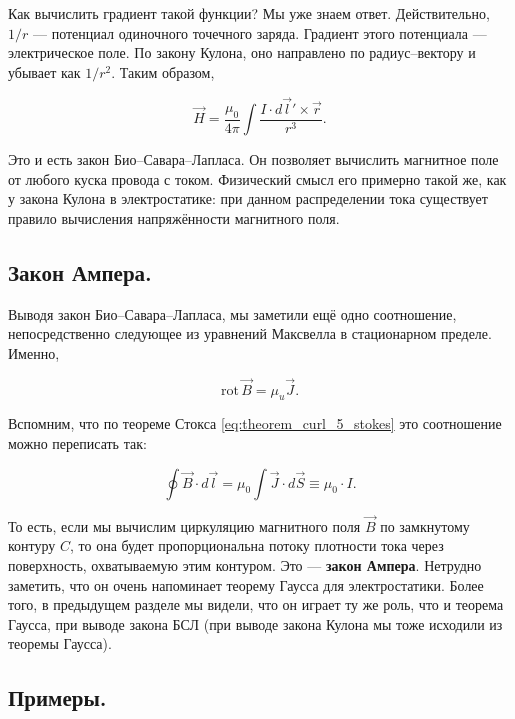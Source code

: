 \documentclass[12pt,a4paper]{article}
\numberwithin{equation}{section}
\numberwithin{equation}{section}
\newcommand{\rot}{\mathrm{rot}\,}
\begin{document}
Как вычислить градиент такой функции? Мы уже знаем
ответ. Действительно, $1/r$ --- потенциал одиночного точечного
заряда. Градиент этого потенциала --- электрическое поле. По закону
Кулона, оно направлено по радиус--вектору и убывает как $1/r^2$. Таким
образом, 

\begin{equation}
  \label{eq:der_bio-savart-laplace_3}
  \vec{H} = \frac{\mu_0}{4\pi} \int \frac{I \cdot d\vec{l}' \times \vec{r}}{r^3}.
\end{equation}

Это и есть закон Био--Савара--Лапласа. Он позволяет вычислить
магнитное поле от любого куска провода с током. Физический смысл его
примерно такой же, как у закона Кулона в электростатике: при данном
распределении тока существует правило вычисления напряжённости
магнитного поля. 

\subsection{Закон Ампера.}
\label{sec:amperes_law}

Выводя закон Био--Савара--Лапласа, мы заметили ещё одно соотношение,
непосредственно следующее из уравнений Максвелла в стационарном
пределе. Именно, 

\begin{equation}
  \label{eq:der_amperes_law}
  \rot \vec{B} = \mu_u \vec{J}.
\end{equation}

Вспомним, что по теореме Стокса \eqref{eq:theorem_curl_5_stokes} это
соотношение можно переписать так: 

\begin{equation}
  \label{eq:amperes_law}
  \oint \vec{B} \cdot d \vec{l} = \mu_0 \int \vec{J} \cdot d\vec{S} \equiv
  \mu_0 \cdot I.
\end{equation}

То есть, если мы вычислим циркуляцию магнитного поля $\vec{B}$ по
замкнутому контуру $C$, то она будет пропорциональна потоку плотности
тока через поверхность, охватываемую этим контуром. Это ---
\textbf{закон Ампера}. Нетрудно заметить, что он очень напоминает
теорему Гаусса для электростатики. Более того, в предыдущем разделе мы
видели, что он играет ту же роль, что и теорема Гаусса, при выводе
закона БСЛ (при выводе закона Кулона мы тоже исходили из теоремы
Гаусса). 

\subsection{Примеры.}
\label{sec:magnetostatics_examples}
\end{document}
